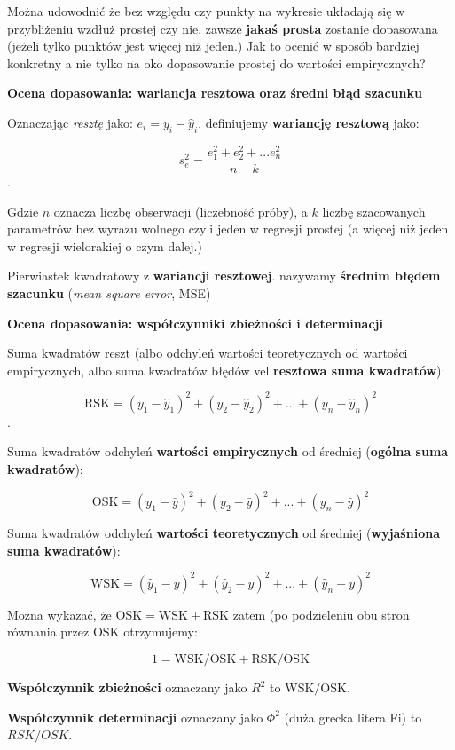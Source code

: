 \documentclass[
  openany]{book}
\begin{document}
Można udowodnić że bez względu czy punkty na wykresie układają się
w przybliżeniu wzdłuż prostej czy nie, zawsze \textbf{jakaś prosta} zostanie
dopasowana (jeżeli tylko punktów jest więcej niż jeden.)
Jak to ocenić w sposób bardziej konkretny a nie tylko na oko dopasowanie
prostej do wartości empirycznych?

\textbf{Ocena dopasowania: wariancja resztowa oraz średni błąd szacunku}

Oznaczając \emph{resztę} jako: \(e_i = y_i - \hat y_i\), definiujemy \textbf{wariancję
resztową} jako:

\[s_e^2 = \frac{e_1^2 + e_2^2 + ... e_n^2}{n-k}\].

Gdzie \(n\) oznacza liczbę obserwacji (liczebność próby), a \(k\) liczbę
szacowanych parametrów bez wyrazu wolnego czyli jeden w regresji
prostej (a więcej niż jeden w regresji wielorakiej o czym dalej.)

Pierwiastek kwadratowy z \textbf{wariancji resztowej}.
nazywamy \textbf{średnim błędem szacunku} (\emph{mean square error}, MSE)

\textbf{Ocena dopasowania: współczynniki zbieżności i determinacji}

Suma kwadratów reszt (albo odchyleń wartości teoretycznych
od wartości empirycznych,
albo suma kwadratów błędów vel \textbf{resztowa suma kwadratów}):

\[\mathrm{RSK} = (y_1 - \hat y_1)^2 + (y_2 - \hat y_2)^2 + ... +  (y_n - \hat y_n)^2\].

Suma kwadratów odchyleń \textbf{wartości empirycznych}
od średniej (\textbf{ogólna suma kwadratów}):

\[\mathrm{OSK} = (y_1 - \bar y)^2 + (y_2 - \bar y)^2 + ... +  (y_n - \bar y)^2\]

Suma kwadratów odchyleń \textbf{wartości teoretycznych}
od średniej (\textbf{wyjaśniona suma kwadratów}):

\[\mathrm{WSK} = (\hat y_1 - \bar y)^2 + (\hat y_2 - \bar y)^2 + ... +  (\hat y_n - \bar y)^2\]

Można wykazać, że \(\mathrm{OSK} = \mathrm{WSK} + \mathrm{RSK}\) zatem (po podzieleniu obu stron
równania przez \(\mathrm{OSK}\) otrzymujemy:

\[ 1 =  \mathrm{WSK}/\mathrm{OSK} + \mathrm{RSK}/\mathrm{OSK}\]

\textbf{Współczynnik zbieżności} oznaczany jako \(R^2\) to \(\mathrm{WSK}/\mathrm{OSK}\).

\textbf{Współczynnik determinacji} oznaczany jako \(\Phi^2\) (duża grecka litera Fi) to \(RSK/OSK\).
\end{document}
